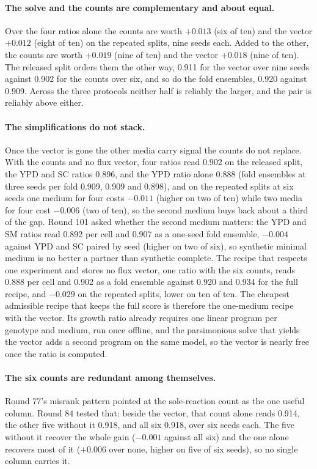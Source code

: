 \paragraph{The solve and the counts are complementary and about equal.} Over the four
ratios alone the counts are worth $+0.013$ (six of ten) and the vector $+0.012$ (eight
of ten) on the repeated splits, nine seeds each. Added to the other, the counts are worth
$+0.019$ (nine of ten) and the vector $+0.018$ (nine of ten). The released split orders them the other way,
0.911 for the vector over nine seeds against 0.902 for the counts over six, and so do the fold
ensembles, 0.920 against 0.909. Across the three protocols neither half is reliably the
larger, and the pair is reliably above either.

\paragraph{The simplifications do not stack.} Once the vector is gone the other media
carry signal the counts do not replace. With the counts and no flux vector, four ratios read
0.902 on the released split, the YPD and SC ratios 0.896, and the YPD ratio alone 0.888
(fold ensembles at three seeds per fold 0.909, 0.909 and 0.898),
and on the repeated splits at six seeds one medium for four costs $-0.011$ (higher on two
of ten) while two media for four cost $-0.006$ (two of ten), so the second medium buys
back about a third of the gap. Round 101 asked whether the second medium matters: the
YPD and SM ratios read 0.892 per cell and 0.907 as a one-seed fold ensemble, $-0.004$
against YPD and SC paired by seed (higher on two of six), so synthetic minimal medium
is no better a partner than synthetic complete. The recipe that respects one experiment and stores no flux vector,
one ratio with the six counts, reads 0.888 per cell and 0.902 as a fold ensemble against
0.920 and 0.934 for the full recipe, and $-0.029$ on the repeated splits, lower on ten of
ten. The cheapest admissible recipe that keeps the full score is therefore the
one-medium recipe with the vector. Its growth ratio already requires one linear program
per genotype and medium, run once offline, and the parsimonious solve that yields the
vector adds a second program on the same model, so the vector is nearly free once the
ratio is computed.

\paragraph{The six counts are redundant among themselves.} Round 77's misrank pattern
pointed at the sole-reaction count as the one useful column. Round 84 tested that: beside the vector, that count alone
reads 0.914, the other five without it 0.918, and all six 0.918, over six seeds each. The
five without it recover the whole gain ($-0.001$ against all six) and the one alone
recovers most of it ($+0.006$ over none, higher on five of six seeds), so no single
column carries it.

